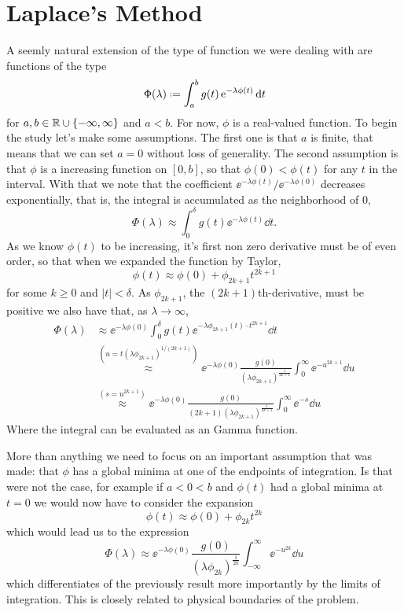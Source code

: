 \section{Laplace's Method}

A seemly natural extension of the type of function we were dealing with are functions of the type
\begin{equation}
	\Phi(\lambda) \deff \int_{a}^{b} g(t) \ee^{-\lambda \phi(t)} \dd t
	\label{equation: Laplace}
\end{equation}
for $a,b \in \mathbb{R} \cup \{-\infty, \infty\}$ and $a<b$. For now, $\phi$ is a real-valued function. To begin the study let's make some assumptions. The first one is that $a$ is finite, that means that we can set $a=0$ without loss of generality. The second assumption is that $\phi$ is a increasing function on $[0,b]$, so that $\phi(0) < \phi(t)$ for any $t$ in the interval. With that we note that the coefficient $\ee^{-\lambda \phi(t)} / \ee^{-\lambda \phi(0)}$ decreases exponentially, that is, the integral is accumulated as the neighborhood of $0$,
$$\Phi(\lambda) \approx \int_{0}^{\delta} g(t) \ee^{-\lambda \phi(t)} \dd t.$$
As we know $\phi(t)$ to be increasing, it's first non zero derivative must be of even order, so that when we expanded the function by Taylor, 
$$\phi(t) \approx \phi(0) + \phi_{2k+1} t^{2k+1}$$
for some $k\geq 0$ and $|t| < \delta$. As $\phi_{2k+1}$, the $(2k+1)$th-derivative, must be positive we also have that, as $\lambda \rightarrow \infty$,
\begin{equation*}
	\begin{split}
		\Phi(\lambda) & \approx \ee^{-\lambda \phi(0)} \int_{0}^{\delta} g(t) \ee^{-\lambda \phi_{2k+1}(t) \cdot t^{2k+1}} \dd t\\
		& \stackrel{(u=t(\lambda \phi_{2k+1})^{1/(2k+1)})}{\approx} \ee^{-\lambda \phi(0)} \frac{g(0)}{(\lambda \phi_{2k+1})^{\frac{1}{2k+1}}} \int_{0}^{\infty} \ee^{-u^{2k+1}} \dd u \\
		& \stackrel{(s=u^{2k+1})}{\approx} \ee^{-\lambda \phi(0)} \frac{g(0)}{ (2k+1)(\lambda \phi_{2k+1})^{\frac{1}{2k+1}}} \int_{0}^{\infty} \ee^{-s} \dd u
	\end{split}
\end{equation*}
Where the integral can be evaluated as an Gamma function.

More than anything we need to focus on an important assumption that was made: that $\phi$ has a global minima at one of the endpoints of integration. Is that were not the case, for example if $a < 0 < b$ and $\phi(t)$ had a global minima at $t=0$ we would now have to consider the expansion
$$\phi(t) \approx \phi(0) + \phi_{2k} t^{2k}$$
which would lead us to the expression
$$\Phi(\lambda) \approx \ee^{-\lambda \phi(0)} \frac{g(0)}{(\lambda \phi_{2k})^{\frac{1}{2k}}} \int_{-\infty}^{\infty} \ee^{-u^{2k}} \dd u$$
which differentiates of the previously result more importantly by the limits of integration. This is closely related to physical boundaries of the problem.

